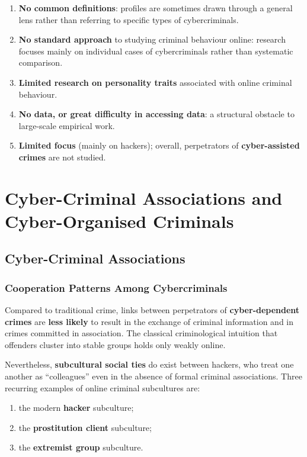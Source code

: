 \documentclass[11pt,a4paper,openany]{report}
\theoremstyle{definition}
\theoremstyle{plain}
\theoremstyle{remark}
\begin{document}
\begin{enumerate}
    \item \textbf{No common definitions}: profiles are sometimes drawn through a general lens rather than referring to specific types of cybercriminals.
    \item \textbf{No standard approach} to studying criminal behaviour online: research focuses mainly on individual cases of cybercriminals rather than systematic comparison.
    \item \textbf{Limited research on personality traits} associated with online criminal behaviour.
    \item \textbf{No data, or great difficulty in accessing data}: a structural obstacle to large-scale empirical work.
    \item \textbf{Limited focus} (mainly on hackers); overall, perpetrators of \textbf{cyber-assisted crimes} are not studied.
\end{enumerate}


\chapter{Cyber-Criminal Associations and Cyber-Organised Criminals}

\section{Cyber-Criminal Associations}

\subsection{Cooperation Patterns Among Cybercriminals}

Compared to traditional crime, links between perpetrators of \textbf{cyber-dependent crimes} are \textbf{less likely} to result in the exchange of criminal information and in crimes committed in association. The classical criminological intuition that offenders cluster into stable groups holds only weakly online.

Nevertheless, \textbf{subcultural social ties} do exist between hackers, who treat one another as ``colleagues'' even in the absence of formal criminal associations. Three recurring examples of online criminal subcultures are:
\begin{enumerate}
    \item the modern \textbf{hacker} subculture;
    \item the \textbf{prostitution client} subculture;
    \item the \textbf{extremist group} subculture.
\end{enumerate}
\end{document}
